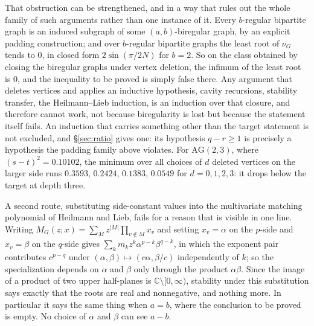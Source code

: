 \documentclass[11pt]{article}
\theoremstyle{remark}
\begin{document}
That obstruction can be strengthened, and in a way that rules out the whole
family of such arguments rather than one instance of it. Every $b$-regular
bipartite graph is an induced subgraph of some $(a,b)$-biregular graph, by an
explicit padding construction; and over $b$-regular bipartite graphs the least
root of $\nu_G$ tends to $0$, in closed form $2\sin(\pi/2N)$ for $b=2$. So on the
class obtained by closing the biregular graphs under vertex deletion, the
infimum of the least root is $0$, and the inequality to be proved is simply
false there. Any argument that deletes vertices and applies an inductive
hypothesis, cavity recursions, stability transfer, the Heilmann--Lieb
induction, is an induction over that closure, and therefore cannot work,
not because biregularity is lost but because the statement itself fails. An induction that
carries something other than the target statement is not excluded, and \S\ref{sec:ratio} gives
one: its hypothesis $q-r\ge1$ is precisely a hypothesis the padding family above violates. For
$\mathrm{AG}(2,3)$, where $(s-t)^2=0.10102$, the minimum over all choices of $d$
deleted vertices on the larger side runs $0.3593$, $0.2424$, $0.1383$, $0.0549$
for $d=0,1,2,3$: it drops below the target at depth three.

A second route, substituting side-constant values into the multivariate matching
polynomial of Heilmann and Lieb, fails for a reason that is visible in one line.
Writing $M_G(z;x)=\sum_Mz^{|M|}\prod_{v\notin M}x_v$ and setting $x_v=\alpha$ on
the $p$-side and $x_v=\beta$ on the $q$-side gives
$\sum_km_kz^k\alpha^{p-k}\beta^{q-k}$, in which the exponent pair contributes
$c^{p-q}$ under $(\alpha,\beta)\mapsto(c\alpha,\beta/c)$ independently of $k$; so
the specialization depends on $\alpha$ and $\beta$ only through the product
$\alpha\beta$. Since the image of a product of two upper half-planes is
$\mathbb C\setminus[0,\infty)$, stability under this substitution says exactly
that the roots are real and nonnegative, and nothing more. In particular it says
the same thing when $a=b$, where the conclusion to be proved is empty. No choice
of $\alpha$ and $\beta$ can see $a-b$.
\end{document}
